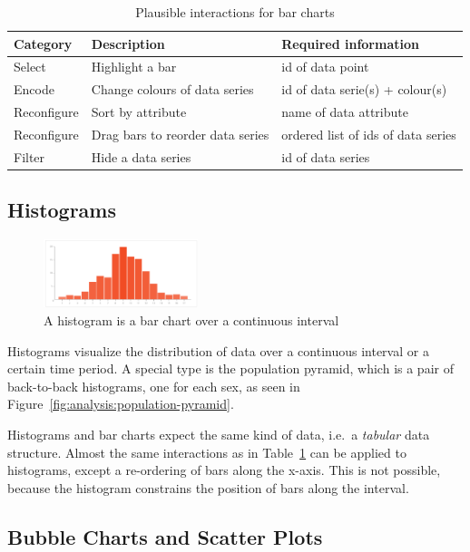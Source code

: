 \begin{table}[H]
  \centering
  \caption{Plausible interactions for bar charts}
  \label{tab:analysis:bar-charts:interactions}
  \begin{tabular*}{\textwidth}{lll}
    \bf Category & \bf Description & \bf Required information \\
    \hline
    Select & Highlight a bar & id of data point \\
    Encode & Change colours of data series & id of data serie(s) + colour(s) \\
    Reconfigure & Sort by attribute & name of data attribute \\
    Reconfigure & Drag bars to reorder data series & ordered list of ids of data series \\
    Filter & Hide a data series & id of data series \\
  \end{tabular*}
\end{table}

\subsection{Histograms}

\begin{figure}
  \centering
  \label{fig:analysis:histograms}
  \caption{A histogram is a bar chart over a continuous interval}%
  \includegraphics[width=0.4\textwidth]{figures/analysis/histogram.png}%
\end{figure}

Histograms visualize the distribution of data over a continuous interval or a certain time period.
A special type is the population pyramid, which is a pair of back-to-back histograms, one for each sex, as seen in Figure~\ref{fig:analysis:population-pyramid}.

Histograms and bar charts expect the same kind of data, i.e.\ a \emph{tabular} data structure.
Almost the same interactions as in Table~\ref{tab:analysis:bar-charts:interactions} can be applied to histograms, except a re-ordering of bars along the x-axis.
This is not possible, because the histogram constrains the position of bars along the interval.

\subsection{Bubble Charts and Scatter Plots}

